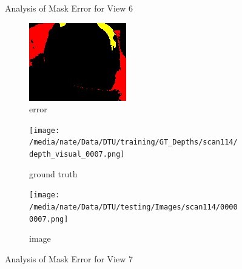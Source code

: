\documentclass{article}
\begin{document}
\begin{figure}
\begin{subfigure}{0.3\textwidth}
		\label{fig:img6}
	\end{subfigure}
	\hfill
	\caption{Analysis of Mask Error for View 6}
	\label{fig:error_analys6}
\end{figure}\begin{figure}
	\centering
	\begin{subfigure}{0.3\textwidth}
		\centering
		\includegraphics[width=\textwidth]{./output/007_error.png}
		\caption{error}
		\label{fig:error7}
	\end{subfigure}
	\hfill
	\centering
	\begin{subfigure}{0.3\textwidth}
		\centering
		\texttt{[image: /media/nate/Data/DTU/training/GT\_Depths/scan114/depth\_visual\_0007.png]}
		\caption{ground truth}
		\label{fig:gt7}
	\end{subfigure}
	\hfill
	\centering
	\begin{subfigure}{0.3\textwidth}
		\centering
		\texttt{[image: /media/nate/Data/DTU/testing/Images/scan114/00000007.png]}
		\caption{image}
		\label{fig:img7}
	\end{subfigure}
	\hfill
	\caption{Analysis of Mask Error for View 7}
	\label{fig:error_analys7}
\end{figure}\begin{figure}
	\centering
	\begin{subfigure}{0.3\textwidth}
		\centering

\end{subfigure}
\end{figure}
\end{document}
